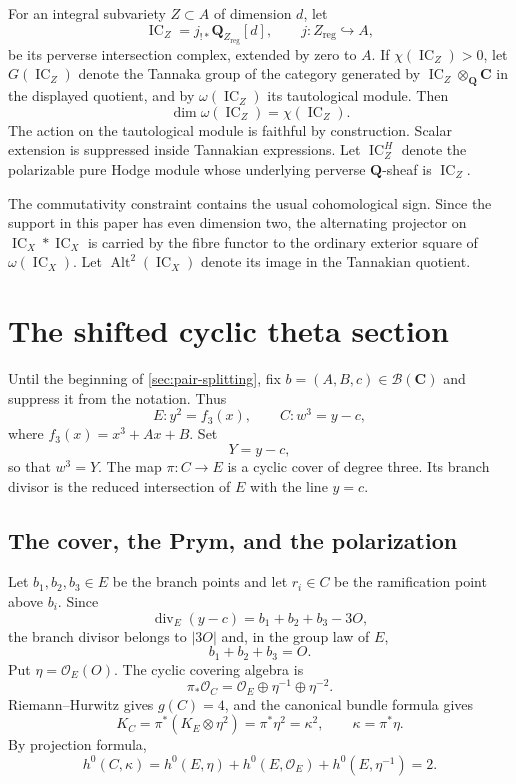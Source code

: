 \documentclass[10pt]{amsart}
\numberwithin{equation}{section}
\theoremstyle{definition}
\theoremstyle{remark}
\newcommand{\CC}{\mathbf C}
\newcommand{\QQ}{\mathbf Q}
\newcommand{\IC}{\operatorname{IC}}
\newcommand{\Alt}{\operatorname{Alt}}
\newcommand{\reg}{\mathrm{reg}}
\newcommand{\cB}{\mathcal B}
\begin{document}
For an integral subvariety $Z\subset A$ of dimension $d$, let
\[
 \IC_Z=j_{!*}\QQ_{Z_{\reg}}[d],
 \qquad j:Z_{\reg}\hookrightarrow A,
\]
be its perverse intersection complex, extended by zero to $A$.  If
$\chi(\IC_Z)>0$, let $G(\IC_Z)$ denote the Tannaka group of the category
generated by $\IC_Z\otimes_{\QQ}\CC$ in the displayed quotient, and by
$\omega(\IC_Z)$ its tautological module.  Then
\[
 \dim\omega(\IC_Z)=\chi(\IC_Z).
\]
The action on the tautological module is faithful by construction.  Scalar
extension is suppressed inside Tannakian expressions.  Let $\IC_Z^H$ denote
the polarizable pure Hodge module whose underlying
perverse $\QQ$-sheaf is $\IC_Z$.

The commutativity constraint contains the usual cohomological sign.  Since
the support in this paper has even dimension two, the alternating projector
on $\IC_X*\IC_X$ is carried by the fibre functor to the ordinary exterior
square of $\omega(\IC_X)$.  Let $\Alt^2(\IC_X)$ denote its image in the
Tannakian quotient.

\section{The shifted cyclic theta section}

Until the beginning of \cref{sec:pair-splitting}, fix
$b=(A,B,c)\in\cB(\CC)$ and suppress it from the notation.  Thus
\[
 E:y^2=f_3(x),\qquad C:w^3=y-c,
\]
where $f_3(x)=x^3+Ax+B$.  Set
\[
 Y=y-c,
\]
so that $w^3=Y$.  The map $\pi:C\to E$ is a cyclic cover of degree three.
Its branch divisor is the reduced intersection of $E$ with the line $y=c$.

\subsection{The cover, the Prym, and the polarization}

Let $b_1,b_2,b_3\in E$ be the branch points and let $r_i\in C$ be the
ramification point above $b_i$.  Since
\[
 \operatorname{div}_E(y-c)=b_1+b_2+b_3-3O,
\]
the branch divisor belongs to $|3O|$ and, in the group law of $E$,
\begin{equation}
 b_1+b_2+b_3=O.
\label{eq:branch-sum}
\end{equation}
Put $\eta=\mathcal O_E(O)$.  The cyclic covering algebra is
\[
 \pi_*\mathcal O_C
 =\mathcal O_E\oplus\eta^{-1}\oplus\eta^{-2}.
\]
Riemann--Hurwitz gives $g(C)=4$, and the canonical bundle formula gives
\[
 K_C=\pi^*(K_E\otimes\eta^2)=\pi^*\eta^2=\kappa^2,
 \qquad \kappa=\pi^*\eta.
\]
By projection formula,
\[
 h^0(C,\kappa)
 =h^0(E,\eta)+h^0(E,\mathcal O_E)+h^0(E,\eta^{-1})=2.
\]
\end{document}
